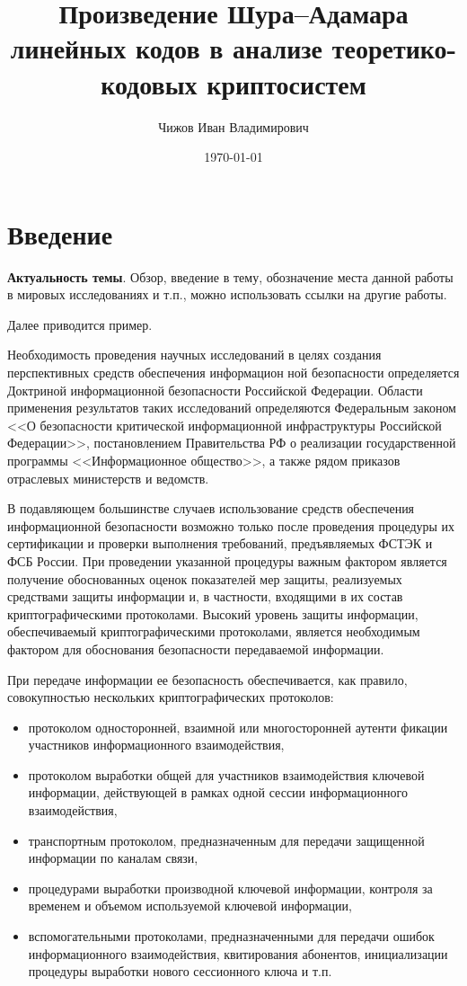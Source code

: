 \documentclass[12pt]{extarticle}
\author{Чижов Иван Владимирович}
\date{\today}
\title{Произведение Шура--Адамара линейных кодов в анализе теоретико-кодовых криптосистем}
\begin{document}
\maketitle
\tableofcontents

\section*{Введение}
\label{sec:orgb759968}

\textbf{Актуальность темы}.
Обзор, введение в тему, обозначение места данной работы в мировых исследованиях и т.п., можно использовать ссылки на другие
работы.

Далее приводится пример.

Необходимость проведения научных исследований в целях создания перспективных средств обеспечения информацион ной безопасности определяется Доктриной информационной безопасности Российской Федерации.
Области применения результатов таких исследований определяются Федеральным законом {}<<О безопасности критической информационной инфраструктуры Российской Федерации>>{}, постановлением Правительства РФ о реализации государственной программы {}<<Информационное общество>>{}, а также рядом приказов отраслевых министерств и ведомств.

В подавляющем большинстве случаев использование средств обеспечения информационной безопасности возможно только после проведения процедуры их сертификации и проверки выполнения требований, предъявляемых ФСТЭК и ФСБ России.
При проведении указанной процедуры важным фактором является получение обоснованных оценок показателей мер защиты, реализуемых средствами защиты информации и, в частности, входящими в их состав криптографическими протоколами.
Высокий уровень защиты информации, обеспечиваемый криптографическими протоколами, является необходимым фактором для обоснования безопасности передаваемой информации.

При передаче информации ее безопасность обеспечивается, как правило, совокупностью нескольких криптографических протоколов:
\begin{itemize}
\item протоколом односторонней, взаимной или многосторонней аутенти фикации участников информационного взаимодействия,
\item протоколом выработки общей для участников взаимодействия ключевой информации, действующей в рамках одной сессии информационного взаимодействия,
\item транспортным протоколом, предназначенным для передачи защищенной информации по каналам связи,
\item процедурами выработки производной ключевой информации, контроля за временем и объемом используемой ключевой информации,
\item вспомогательными протоколами, предназначенными для передачи ошибок информационного взаимодействия, квитирования абонентов, инициализации процедуры выработки нового сессионного ключа и т.п.
\end{itemize}
\end{document}
